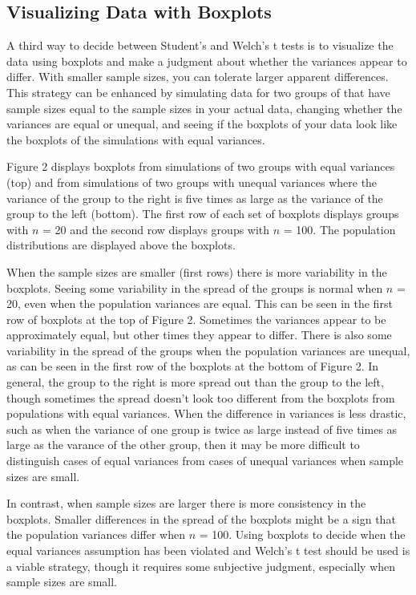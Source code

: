 \documentclass[man,a4paper,noextraspace,apacite]{apa6}
\begin{document}
\subsection{Visualizing Data with Boxplots} 

    A third way to decide between Student's and Welch's t tests is to visualize the data using boxplots and make a judgment 
about whether the variances appear to differ.  With smaller sample sizes, you 
can tolerate larger apparent differences. This strategy can be enhanced by 
simulating data for two groups of that have sample sizes equal to the sample 
sizes in your actual data, changing whether the variances are equal or unequal, 
and seeing if the boxplots of your data look like the boxplots of the 
simulations with equal variances. 

    Figure 2 displays boxplots from simulations of two groups with equal 
variances (top) and from simulations of two groups with unequal variances where 
the variance of the group to the right is five times as large as the variance 
of the group to the left (bottom). The first row of each set of boxplots 
displays groups with $n$ = 20 and the second row displays groups with $n$ = 
100. The population distributions are displayed above the boxplots. 

When the 
sample sizes are smaller (first rows) there is more variability in the boxplots. Seeing some 
variability in the spread of the groups is normal when $n$ = 20, even when the population 
variances are equal. This can be seen in the first row of boxplots at the top of Figure 2.
Sometimes the variances appear to be approximately equal, 
but other times they appear to differ. There is also some variability in the spread of the 
groups when the population variances are unequal, as can be seen in the first row of the 
boxplots at the bottom of Figure 2. In general, the group to the right is more spread out than the 
group to the left, though sometimes the spread doesn't look too different from the 
boxplots from populations with equal variances. When the difference in variances is 
less drastic, such as when the variance of one group is twice as large instead of 
five times as large as the varance of the other group, then it may be more difficult
to distinguish cases of equal variances from cases of unequal variances when sample
sizes are small.

In contrast, when sample sizes are larger there is more 
consistency in the boxplots. Smaller differences in the spread of the boxplots 
might be a sign that the population variances differ when $n$ = 100. Using boxplots
to decide when the equal variances assumption has been violated and Welch's t test
should be used is a viable strategy, though it requires some subjective judgment,
especially when sample sizes are small.
\end{document}
